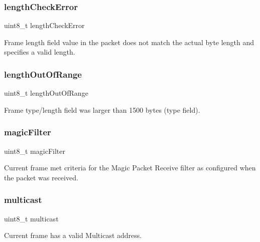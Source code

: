 \subsubsection{\texorpdfstring{lengthCheckError}{lengthCheckError}}
{\footnotesize\ttfamily uint8\+\_\+t length\+Check\+Error}



Frame length field value in the packet does not match the actual byte length and specifies a valid length. 

\mbox{\label{struct_r_s_v_addceef1c25a3a79f0809d2088d7fad31}} 
\subsubsection{\texorpdfstring{lengthOutOfRange}{lengthOutOfRange}}
{\footnotesize\ttfamily uint8\+\_\+t length\+Out\+Of\+Range}



Frame type/length field was larger than 1500 bytes (type field). 

\mbox{\label{struct_r_s_v_a1369352b01723f3fe85ae1504216e1fa}} 
\subsubsection{\texorpdfstring{magicFilter}{magicFilter}}
{\footnotesize\ttfamily uint8\+\_\+t magic\+Filter}



Current frame met criteria for the Magic Packet Receive filter as configured when the packet was received. 

\mbox{\label{struct_r_s_v_ab40062c1424a2dfaf51425eb5f3ebb6e}} 
\subsubsection{\texorpdfstring{multicast}{multicast}}
{\footnotesize\ttfamily uint8\+\_\+t multicast}



Current frame has a valid Multicast address. 

\mbox{\label{struct_r_s_v_a3c6d714f4e9f6e6a8f1d5ab5cf3d4b58}} 
